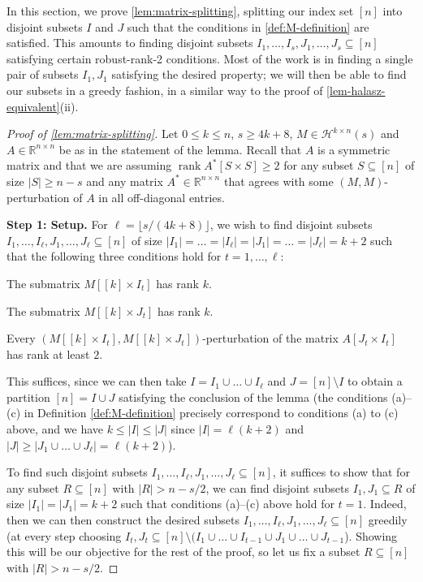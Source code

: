 \documentclass[english]{article}
\theoremstyle{remark}
\numberwithin{equation}{section}
\numberwithin{figure}{section}
\newcommand{\su}{\subseteq}
\newcommand{\RR}{\mathbb{R}}
\newcommand{\on}{\operatorname}
\begin{document}
In this section, we prove \cref{lem:matrix-splitting}, splitting our index set $[n]$ into disjoint subsets $I$ and $J$ such that the conditions in \cref{def:M-definition} are satisfied. This amounts to finding disjoint subsets $I_1,\dots,I_s,J_1,\dots,J_s\su [n]$ satisfying certain robust-rank-2 conditions. Most of the work is in finding a single pair of subsets $I_1,J_1$ satisfying the desired property; we will then be able to find our subsets in a greedy fashion, in a similar way to the proof of \cref{lem-halasz-equivalent}(ii).

\begin{proof}[Proof of \cref{lem:matrix-splitting}]
Let $0\le k\le n$, $s\ge 4k+8$, $M\in\mathcal{H}^{k\times n}(s)$ and $A\in \RR^{n\times n}$ be as in the statement of the lemma. Recall that $A$ is a symmetric matrix and that we are assuming $\on{rank} A^*[S\times S]\ge 2$ for any subset $S\subseteq [n]$ of size $|S|\ge n- s$ and any matrix $A^*\in \RR^{n\times n}$ that agrees with some $(M,M)$-perturbation of $A$ in all off-diagonal entries. 

\textbf{Step 1: Setup.} For $\ell=\lfloor s/(4k+8)\rfloor$, we wish to find disjoint subsets $I_1,\dots, I_\ell, J_1,\dots,J_\ell\su [n]$ of size $|I_1|=\dots=|I_\ell|=|J_1|=\dots=|J_\ell|=k+2$ such that the following three conditions hold for $t=1,\dots, \ell$:
\begin{compactitem}
    \item[(a)] The submatrix $M[[k]\times I_t]$ has rank $k$.
    \item[(b)] The submatrix $M[[k]\times J_t]$ has rank $k$. 
    \item[(c)] Every $(M[[k]\times I_t],M[[k]\times J_t])$-perturbation of the matrix $A[J_t\times I_t]$ has rank at least $2$.
\end{compactitem}
This suffices, since we can then take $I=I_1\cup \dots\cup I_\ell$ and $J=[n]\setminus I$ to obtain a partition $[n]=I\cup J$ satisfying the conclusion of the lemma (the conditions (a)--(c) in Definition \ref{def:M-definition} precisely correspond to conditions (a) to (c) above, and we have $k\le |I|\le |J|$ since $|I|=\ell(k+2)$ and $|J|\ge |J_1\cup \dots\cup J_\ell|=\ell(k+2)$).

To find such disjoint subsets $I_1,\dots, I_\ell, J_1,\dots,J_\ell\su [n]$, it suffices to show that for any subset $R\subseteq [n]$ with $|R|> n-s/2$, we can find disjoint subsets $I_1,J_1\subseteq R$ of size $|I_1|=|J_1|=k+2$ such that conditions (a)--(c) above hold for $t=1$. Indeed, then we can then construct the desired subsets $I_1,\dots, I_\ell, J_1,\dots,J_\ell\su [n]$ greedily (at every step choosing $I_t,J_t\subseteq [n]\setminus (I_1\cup\dots\cup I_{t-1}\cup J_1\cup\dots\cup J_{t-1}$). Showing this will be our objective for the rest of the proof, so let us fix a subset $R\subseteq [n]$ with $|R|> n-s/2$.


\end{proof}
\end{document}
